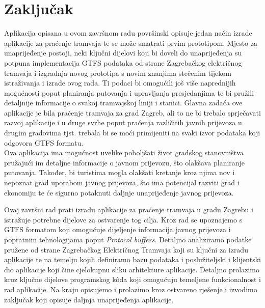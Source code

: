 \documentclass[zavrsnirad]{fer}
\begin{document}
\chapter{Zaključak}
\label{pog:zakljucak}
Aplikacija opisana u ovom završnom radu površinski opisuje jedan način izrade aplikacije za praćenje tramvaja te se može smatrati prvim prototipom. Mjesto za unaprijeđenje postoji, neki ključni dijelovi koji bi doveli do unaprijeđenja su potpuna implementacija GTFS podataka od strane Zagrebačkog električnog tramvaja i izgradnja novog prototipa s novim znanjima stečenim tijekom istraživanja i izrade ovog rada. Ti podaci bi omogućili još više naprednijih mogućnosti poput planiranja putovanja i upravljanja presjedanjima te bi pružili detaljnije informacije o svakoj tramvajskoj liniji i stanici. Glavna zadaća ove aplikacije je bila praćenje tramvaja za grad Zagreb, ali to ne bi trebalo sprječavati razvoj aplikacije i u druge svrhe poput praćenja različitih javnih prijevoza u drugim gradovima tjst. trebala bi se moći primijeniti na svaki izvor podataka koji odgovora GTFS formatu.\\
Ova aplikacija ima mogućnost uvelike poboljšati život gradskog stanovništva pružajući im detaljne informacije o javnom prijevozu, što olakšava planiranje putovanja. Također, bi turistima mogla olakšati kretanje kroz njima nov i nepoznat grad uporabom javnog prijevoza, što ima potencijal razviti grad i ekonomiju te će sigurno potaknuti daljnje unaprijeđenje javnog prijevoza.



\nocite{*}




\begin{sazetak}
	Ovaj završni rad prati izradu aplikacije za praćenje tramvaja u gradu Zagrebu i istražuje potrebne dijelove za ostvarenje tog cilja. Kroz rad se upoznajemo s GTFS formatom koji omogućuje dijeljenje informacija javnog prijevoza i popratnim tehnologijama poput \textit{Protocol buffers}. Detaljno analiziramo podatke pružene od strane Zagrebačkog Električnog Tramvaja koji su ključni za izradu aplikacije te na temelju kojih definiramo bazu podataka i poslužiteljski i klijentski dio aplikacije koji čine cjelokupnu sliku arhitekture aplikacije. Detaljno prolazimo kroz ključne dijelove programskog k\^oda koji omogućuju temeljene funkcionalnost i rad aplikacije.
	Na kraju opisujemo i prolazimo kroz ostvareno rješenje i izvodimo zaključak koji opisuje daljnja unaprijeđenja aplikacije.
\end{sazetak}
\end{document}
